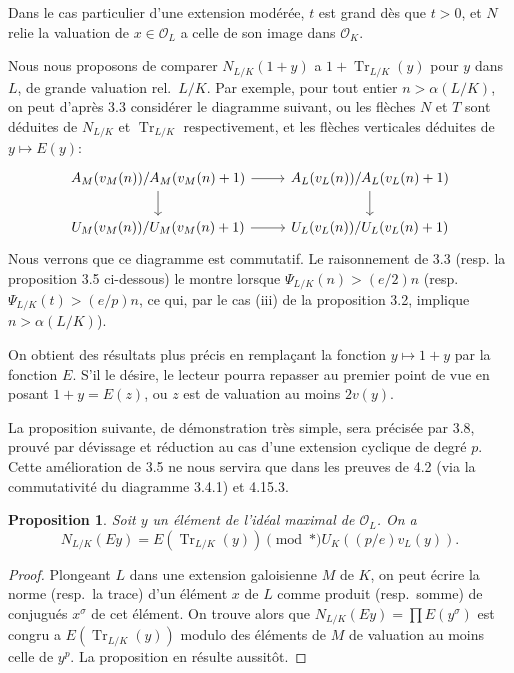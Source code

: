 \documentclass[12pt,a4paper]{article}
\theoremstyle{plain}
\newtheorem{proposition}[theorem]{Proposition}
\theoremstyle{definition}
\theoremstyle{remark}
\DeclareMathOperator{\Tr}{Tr}
\newcommand{\cO}{\mathcal{O}}
\providecommand{\cO}{\mathcal{O}}
\providecommand{\Tr}{\operatorname{Tr}}
\begin{document}
Dans le cas particulier d'une extension mod\'er\'ee, $t$ est grand d\`es que $t > 0$, et $N$ relie la valuation de $x \in \cO_L$ a celle de son image dans $\cO_K$.

Nous nous proposons de comparer $N_{L/K}(1+y)$ a $1 + \Tr_{L/K}(y)$ pour $y$ dans $L$, de grande valuation rel.~$L/K$. Par exemple, pour tout entier $n > \alpha(L/K)$, on peut d'apr\`es 3.3 consid\'erer le diagramme suivant, ou les fl\`eches $N$ et $T$ sont d\'eduites de $N_{L/K}$ et $\Tr_{L/K}$ respectivement, et les fl\`eches verticales d\'eduites de $y \mapsto E(y)$:
\begin{equation}\label{eq:3.4.1}
\begin{tikzcd}
A_M(v_M(n))/A_M(v_M(n)+1) \arrow[r] \arrow[d] & A_L(v_L(n))/A_L(v_L(n)+1) \arrow[d] \\
U_M(v_M(n))/U_M(v_M(n)+1) \arrow[r] & U_L(v_L(n))/U_L(v_L(n)+1)
\end{tikzcd}
\end{equation}
Nous verrons que ce diagramme est commutatif. Le raisonnement de 3.3 (resp. la proposition 3.5 ci-dessous) le montre lorsque $\Psi_{L/K}(n) > (e/2)n$ (resp. $\Psi_{L/K}(t) > (e/p)n$, ce qui, par le cas (iii) de la proposition 3.2, implique $n > \alpha(L/K)$).

On obtient des r\'esultats plus pr\'ecis en rempla\c{c}ant la fonction $y \mapsto 1+y$ par la fonction $E$. S'il le d\'esire, le lecteur pourra repasser au premier point de vue en posant $1+y = E(z)$, ou $z$ est de valuation au moins $2v(y)$.

La proposition suivante, de d\'emonstration tr\`es simple, sera pr\'ecis\'ee par 3.8, prouv\'e par d\'evissage et r\'eduction au cas d'une extension cyclique de degr\'e $p$. Cette am\'elioration de 3.5 ne nous servira que dans les preuves de 4.2 (via la commutativit\'e du diagramme 3.4.1) et 4.15.3.

\begin{proposition}\label{prop:3.5}
Soit $y$ un \'el\'ement de l'id\'eal maximal de $\cO_L$. On a
\[
N_{L/K}(Ey) = E(\Tr_{L/K}(y)) \pmod{*} U_K((p/e) v_L(y)).
\]
\end{proposition}

\begin{proof}
Plongeant $L$ dans une extension galoisienne $M$ de $K$, on peut \'ecrire la norme (resp.~la trace) d'un \'el\'ement $x$ de $L$ comme produit (resp.~somme) de conjugu\'es $x^\sigma$ de cet \'el\'ement. On trouve alors que $N_{L/K}(Ey) = \prod E(y^\sigma)$ est congru a $E(\Tr_{L/K}(y))$ modulo des \'el\'ements de $M$ de valuation au moins celle de $y^p$. La proposition en r\'esulte aussit\^ot.
\end{proof}
\end{document}
